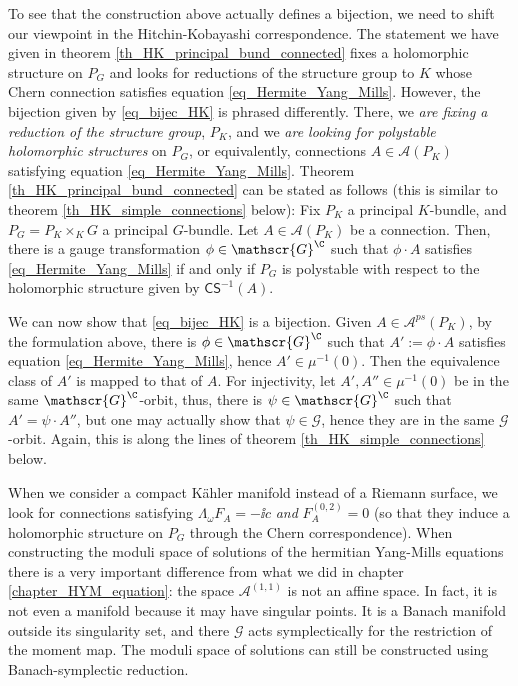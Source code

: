 To see that the construction above actually defines a bijection, we need to shift our viewpoint in the Hitchin-Kobayashi correspondence. The statement we have given in theorem \ref{th_HK_principal_bund_connected} fixes a holomorphic structure on \(P_G\) and looks for reductions of the structure group to \(K\) whose Chern connection satisfies equation \eqref{eq_Hermite_Yang_Mills}. However, the bijection given by \eqref{eq_bijec_HK} is phrased differently. There, we \textit{are fixing a reduction of the structure group}, \(P_K\), and we \textit{are looking for polystable holomorphic structures} on \(P_G\), or equivalently, connections \(A\in \mathscr{A}(P_K)\) satisfying equation \eqref{eq_Hermite_Yang_Mills}. Theorem \eqref{th_HK_principal_bund_connected} can be stated as follows (this is similar to theorem \ref{th_HK_simple_connections} below): Fix \(P_K\) a principal \(K\)-bundle, and \(P_G=P_K \times_K G\) a principal \(G\)-bundle. Let \(A \in \mathscr{A}(P_K)\) be a connection. Then, there is a gauge transformation \(\phi \in \mathscr{G}^\C\) such that \(\phi\cdot A\) satisfies \eqref{eq_Hermite_Yang_Mills} if and only if \(P_G\) is polystable with respect to the holomorphic structure given by \(\mathsf{CS}^{-1}(A)\). 

We can now show that \eqref{eq_bijec_HK} is a bijection. Given \(A \in \mathscr{A}^{ps}(P_K)\), by the formulation above, there is \(\phi \in \mathscr{G}^\C\) such that \(A':=\phi\cdot A\) satisfies equation \eqref{eq_Hermite_Yang_Mills}, hence \(A'\in \mu^{-1}(0)\). Then the equivalence class of \(A'\) is mapped to that of \(A\). For injectivity, let \(A', A''\in \mu^{-1}(0)\) be in the same \(\mathscr{G}^\C\)-orbit, thus, there is \(\psi\in \mathscr{G}^\C\) such that \(A'=\psi\cdot A''\), but one may actually show that \(\psi\in \mathscr{G}\), hence they are in the same \(\mathscr{G}\)-orbit. Again, this is along the lines of theorem \ref{th_HK_simple_connections} below.

When we consider a compact Kähler manifold instead of a Riemann surface, we look for connections satisfying \(\Lambda_\omega F_A=-\ii c\) \textit{and} \(F_A^{(0,2)}=0\) (so that they induce a holomorphic structure on \(P_G\) through the Chern correspondence). When constructing the moduli space of solutions of the hermitian Yang-Mills equations there is a very important difference from what we did in chapter \ref{chapter_HYM_equation}: the space \(\mathscr{A}^{(1,1)}\) is not an affine space. In fact, it is not even a manifold because it may have singular points. It is a Banach manifold outside its singularity set, and there \(\mathscr{G}\) acts symplectically for the restriction of the moment map. The moduli space of solutions can still be constructed using Banach-symplectic reduction.

